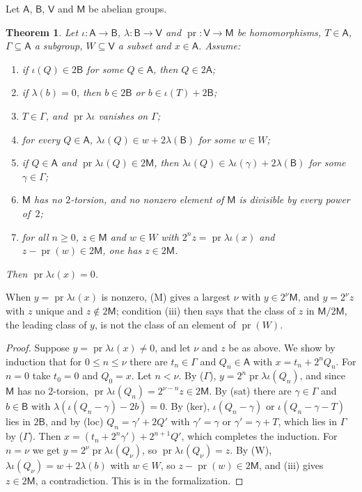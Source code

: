 \documentclass[11pt]{amsart}
\newtheorem{theorem}{Theorem}[section]
\theoremstyle{definition}
\numberwithin{equation}{section}
\newcommand{\pr}{\operatorname{pr}}
\newcommand{\lean}[1]{\ignorespaces}
\begin{document}
Let $\mathsf A$, $\mathsf B$, $\mathsf V$ and $\mathsf M$ be abelian groups.

\begin{theorem}\label{thm:stoll-one-place}\lean{FurioLombardo.M4.stoll_log}
Let $\iota:\mathsf A\to\mathsf B$, $\lambda:\mathsf B\to\mathsf V$ and $\pr:\mathsf V\to\mathsf M$ be homomorphisms, $T\in\mathsf A$, $\Gamma\subseteq\mathsf A$ a subgroup, $W\subseteq\mathsf V$ a subset and $x\in\mathsf A$. Assume:
\begin{enumerate}
\item[(loc)] if $\iota(Q)\in2\mathsf B$ for some $Q\in\mathsf A$, then $Q\in2\mathsf A$;
\item[(ker)] if $\lambda(b)=0$, then $b\in2\mathsf B$ or $b\in\iota(T)+2\mathsf B$;
\item[($\Gamma$)] $T\in\Gamma$, and $\pr\lambda\iota$ vanishes on $\Gamma$;
\item[(W)] for every $Q\in\mathsf A$, $\lambda\iota(Q)\in w+2\lambda(\mathsf B)$ for some $w\in W$;
\item[(sat)] if $Q\in\mathsf A$ and $\pr\lambda\iota(Q)\in2\mathsf M$, then $\lambda\iota(Q)\in\lambda\iota(\gamma)+2\lambda(\mathsf B)$ for some $\gamma\in\Gamma$;
\item[(M)] $\mathsf M$ has no $2$-torsion, and no nonzero element of $\mathsf M$ is divisible by every power of~$2$;
\item[(iii)] for all $n\ge0$, $z\in\mathsf M$ and $w\in W$ with $2^nz=\pr\lambda\iota(x)$ and $z-\pr(w)\in2\mathsf M$, one has $z\in2\mathsf M$.
\end{enumerate}
Then $\pr\lambda\iota(x)=0$.
\end{theorem}

When $y=\pr\lambda\iota(x)$ is nonzero, (M) gives a largest $\nu$ with $y\in2^\nu\mathsf M$, and $y=2^\nu z$ with $z$ unique and $z\notin2\mathsf M$; condition (iii) then says that the class of $z$ in $\mathsf M/2\mathsf M$, the leading class of $y$, is not the class of an element of $\pr(W)$.

\begin{proof}
Suppose $y=\pr\lambda\iota(x)\neq0$, and let $\nu$ and $z$ be as above. We show by induction that for $0\le n\le\nu$ there are $t_n\in\Gamma$ and $Q_n\in\mathsf A$ with $x=t_n+2^nQ_n$. For $n=0$ take $t_0=0$ and $Q_0=x$. Let $n<\nu$. By ($\Gamma$), $y=2^n\pr\lambda\iota(Q_n)$, and since $\mathsf M$ has no $2$-torsion, $\pr\lambda\iota(Q_n)=2^{\nu-n}z\in2\mathsf M$. By (sat) there are $\gamma\in\Gamma$ and $b\in\mathsf B$ with $\lambda(\iota(Q_n-\gamma)-2b)=0$. By (ker), $\iota(Q_n-\gamma)$ or $\iota(Q_n-\gamma-T)$ lies in $2\mathsf B$, and by (loc) $Q_n=\gamma'+2Q'$ with $\gamma'=\gamma$ or $\gamma'=\gamma+T$, which lies in $\Gamma$ by ($\Gamma$). Then $x=(t_n+2^n\gamma')+2^{n+1}Q'$, which completes the induction. For $n=\nu$ we get $y=2^\nu\pr\lambda\iota(Q_\nu)$, so $\pr\lambda\iota(Q_\nu)=z$. By (W), $\lambda\iota(Q_\nu)=w+2\lambda(b)$ with $w\in W$, so $z-\pr(w)\in2\mathsf M$, and (iii) gives $z\in2\mathsf M$, a contradiction. This is  in the formalization.
\end{proof}
\end{document}
